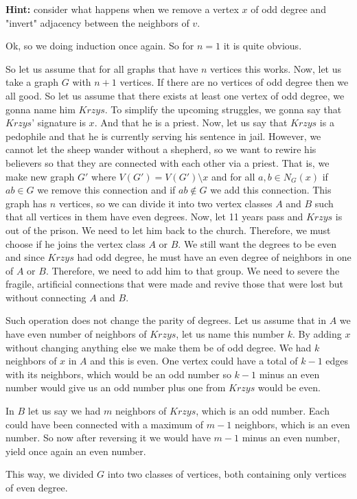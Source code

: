 \documentclass{article}[13pt]
\begin{document}
\textbf{Hint:} consider what happens when we remove a vertex $x$ of odd degree and "invert" adjacency between the neighbors of $v$.
\medskip

Ok, so we doing induction once again. So for $n=1$ it is quite obvious. 

So let us assume that for all graphs that have $n$ vertices this works. Now, let us take a graph $G$ with $n+1$ vertices. If there are no vertices of odd degree then we all good. So let us assume that there exists at least one vertex of odd degree, we gonna name him $Krzys$. To simplify the upcoming struggles, we gonna say that $Krzys$' signature is $x$. And that he is a priest. Now, let us say that $Krzys$ is a pedophile and that he is currently serving his sentence in jail. However, we cannot let the sheep wander without a shepherd, so we want to rewire his believers so that they are connected with each other via a priest. That is, we make new graph $G'$ where $V(G')=V(G')\setminus x$ and for all $a,b\in N_G(x)$ if $ab\in G$ we remove this connection and if $ab\notin G$ we add this connection. This graph has $n$ vertices, so we can divide it into two vertex classes $A$ and $B$ such that all vertices in them have even degrees. Now, let 11 years pass and $Krzys$ is out of the prison. We need to let him back to the church. Therefore, we must choose if he joins the vertex class $A$ or $B$. We still want the degrees to be even and since $Krzys$ had odd degree, he must have an even degree of neighbors in one of $A$ or $B$. Therefore, we need to add him to that group. We need to severe the fragile, artificial connections that were made and revive those that were lost but without connecting $A$ and $B$. 

Such operation does not change the parity of degrees. Let us assume that in $A$ we have even number of neighbors of $Krzys$, let us name this number $k$. By adding $x$ without changing anything else we make them be of odd degree. We had $k$ neighbors of $x$ in $A$ and this is even. One vertex could have a total of $k-1$ edges with its neighbors, which would be an odd number so $k-1$ minus an even number would give us an odd number plus one from $Krzys$ would be even.

In $B$ let us say we had $m$ neighbors of $Krzys$, which is an odd number. Each could have been connected with a maximum of $m-1$ neighbors, which is an even number. So now after reversing it we would have $m-1$ minus an even number, yield once again an even number.

This way, we divided $G$ into two classes of vertices, both containing only vertices of even degree.
\end{document}

